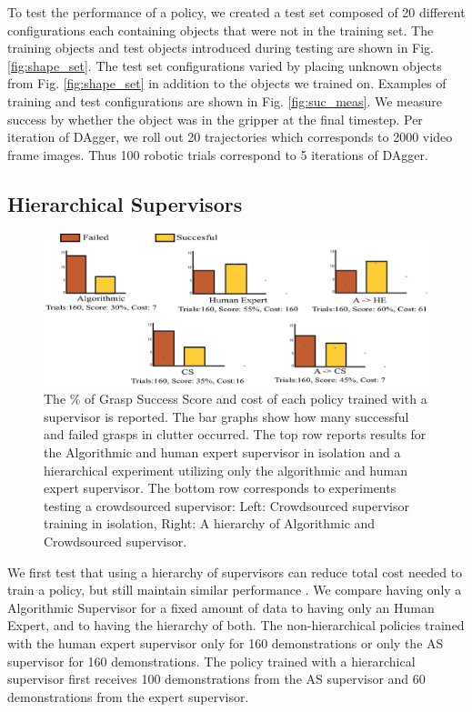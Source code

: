 \documentclass[10pt, conference]{ieeeconf}      %
\begin{document}
To test the performance of a policy, we created a test set composed of 20 different configurations each containing
objects that were not in the training set.  The training objects and test
objects introduced during testing are shown in Fig. \ref{fig:shape_set}. The test set configurations varied by placing
unknown objects from Fig. \ref{fig:shape_set} in addition to the objects we trained on. Examples of training and test configurations are shown in Fig. \ref{fig:suc_meas}.  We measure success by whether the object was in the gripper at the final timestep. 
Per iteration of DAgger, we roll out 20 trajectories which corresponds to 2000 video frame images. Thus 100 robotic trials correspond to 5 iterations of DAgger.

\subsection{Hierarchical Supervisors}

\begin{figure}[t]
\centering
\includegraphics{f_figs/results.eps}

\caption{ \footnotesize The \% of Grasp Success Score and cost of each policy trained with a supervisor is reported. The bar graphs
show how many successful and failed grasps in clutter occurred. The top row 
reports results for the Algorithmic and human expert supervisor in isolation and a hierarchical experiment
utilizing only the algorithmic and human expert supervisor.
The bottom row corresponds to experiments testing a crowdsourced supervisor: Left: Crowdsourced supervisor training in
isolation, Right: A hierarchy of Algorithmic and Crowdsourced supervisor.}

\label{fig:perf_results}
\end{figure}

We first test that using a hierarchy of supervisors can reduce total cost needed to train a policy, but still maintain
similar performance . We compare having only a Algorithmic Supervisor for a fixed amount of data to having only an Human Expert,
and to having the hierarchy of both. The non-hierarchical policies trained with the human expert supervisor only for
160 demonstrations or only the AS supervisor for 160 demonstrations.  The policy trained with a hierarchical supervisor
first receives  100 demonstrations from the AS supervisor and  60 demonstrations from the expert supervisor. 
\end{document}
